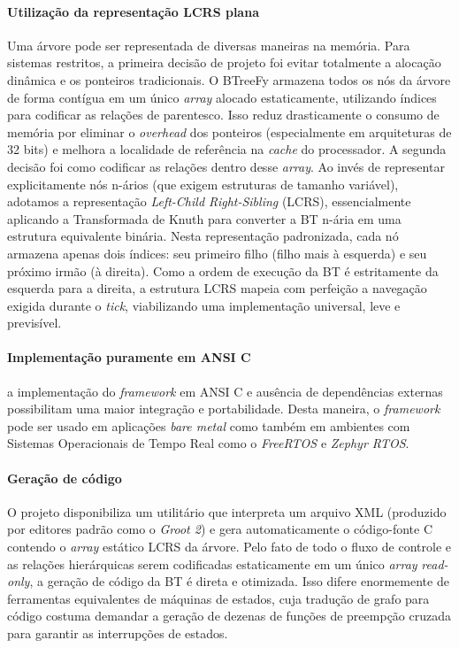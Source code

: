 \documentclass[conference]{IEEEtran}
\begin{document}
\paragraph{\textbf{Utilização da representação LCRS plana}} Uma árvore pode ser representada de diversas maneiras na memória. Para sistemas restritos, a primeira decisão de projeto foi evitar totalmente a alocação dinâmica e os ponteiros tradicionais. O BTreeFy armazena todos os nós da árvore de forma contígua em um único \textit{array} alocado estaticamente, utilizando índices para codificar as relações de parentesco. Isso reduz drasticamente o consumo de memória por eliminar o \textit{overhead} dos ponteiros (especialmente em arquiteturas de 32 bits) e melhora a localidade de referência na \textit{cache} do processador.
A segunda decisão foi como codificar as relações dentro desse \textit{array}. Ao invés de representar explicitamente nós n-ários (que exigem estruturas de tamanho variável), adotamos a representação \textit{Left-Child Right-Sibling} (LCRS), essencialmente aplicando a Transformada de Knuth para converter a BT n-ária em uma estrutura equivalente binária. Nesta representação padronizada, cada nó armazena apenas dois índices: seu primeiro filho (filho mais à esquerda) e seu próximo irmão (à direita). Como a ordem de execução da BT é estritamente da esquerda para a direita, a estrutura LCRS mapeia com perfeição a navegação exigida durante o \textit{tick}, viabilizando uma implementação universal, leve e previsível.

\paragraph{\textbf{Implementação puramente em ANSI C}} a implementação do \textit{framework} em ANSI C e ausência de dependências externas possibilitam uma maior integração e portabilidade. Desta maneira, o \textit{framework} pode ser usado em aplicações \textit{bare metal} como também em ambientes com Sistemas Operacionais de Tempo Real como o \textit{FreeRTOS} e \textit{Zephyr RTOS}.

\paragraph{\textbf{Geração de código}} O projeto disponibiliza um utilitário que interpreta um arquivo XML (produzido por editores padrão como o \textit{Groot 2}) e gera automaticamente o código-fonte C contendo o \textit{array} estático LCRS da árvore. Pelo fato de todo o fluxo de controle e as relações hierárquicas serem codificadas estaticamente em um único \textit{array} \textit{read-only}, a geração de código da BT é direta e otimizada. Isso difere enormemente de ferramentas equivalentes de máquinas de estados, cuja tradução de grafo para código costuma demandar a geração de dezenas de funções de preempção cruzada para garantir as interrupções de estados.
\end{document}
